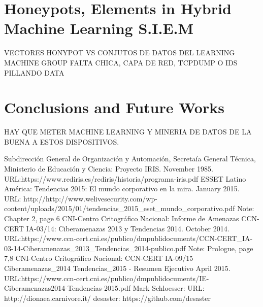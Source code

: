 \documentclass[a4paper]{llncs}
\begin{document}
\section{Honeypots, Elements in Hybrid Machine Learning S.I.E.M}
VECTORES HONYPOT VS CONJUTOS DE DATOS DEL LEARNING MACHINE GROUP
FALTA CHICA, CAPA DE RED, TCPDUMP O IDS PILLANDO DATA

\section{Conclusions and Future Works}
HAY QUE METER MACHINE LEARNING Y MINERIA DE DATOS DE LA BUENA A ESTOS DISPOSITIVOS.

\begin{thebibliography}{5}
Subdirección General de Organización y Automación, Secretaía General Técnica, Ministerio de Educación y Ciencia:
Proyecto IRIS.
November 1985.\\
URL:https://www.rediris.es/rediris/historia/programa-iris.pdf
%
ESSET Latino América:
Tendencias 2015: El mundo corporativo en la mira.
January 2015.\\
URL: http://http://www.welivesecurity.com/wp-content/uploads/2015/01/tendencias\_2015\_eset\_mundo\_corporativo.pdf
Note: Chapter 2, page 6
%
CNI-Centro Critográfico Nacional:
Informe de Amenazas CCN-CERT IA-03/14: Ciberamenazas 2013 y Tendencias 2014.
October 2014.\\
URL:https://www.ccn-cert.cni.es/publico/dmpublidocuments/CCN-CERT\_IA-03-14-Ciberamenazas\_2013\_Tendencias\_2014-publico.pdf
Note: Prologue, page 7,8
%
CNI-Centro Critográfico Nacional:
CCN-CERT IA-09/15 Ciberamenazas\_2014 Tendencias\_2015 - Resumen Ejecutivo
April 2015.\\
URL:https://www.ccn-cert.cni.es/publico/dmpublidocuments/IE-Ciberamenazas2014-Tendencias-2015.pdf
%
Mark Schloesser:
URL: http://dionaea.carnivore.it/
%
desaster:
https://github.com/desaster
%
\end{thebibliography}
\end{document}
